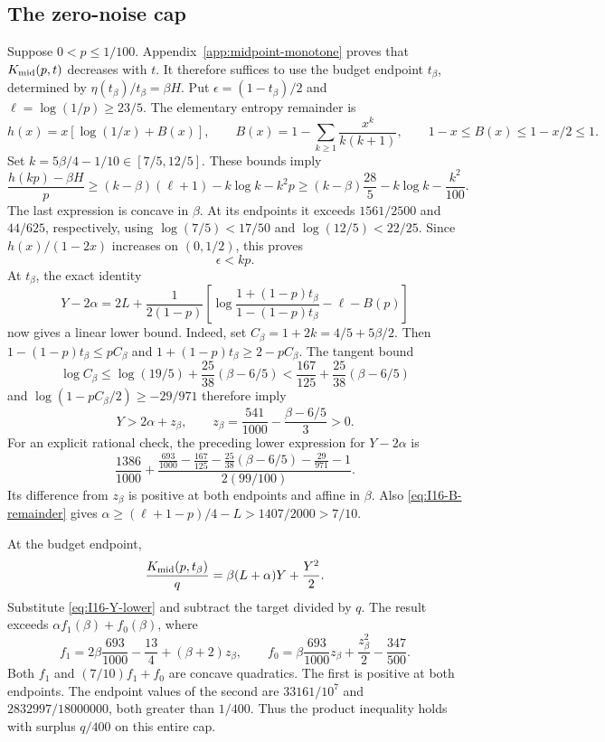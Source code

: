 \documentclass[11pt]{article}
\theoremstyle{remark}\newtheorem{remark}[theorem]{Remark}
\numberwithin{equation}{section}
\begin{document}
\subsection{The zero-noise cap}
Suppose $0<p\le1/100$. Appendix~\ref{app:midpoint-monotone} proves that
$K_{\rm mid}(p,t)$ decreases with $t$. It therefore suffices to use the budget
endpoint $t_\beta$, determined by $\eta(t_\beta)/t_\beta=\beta H$.
Put $\epsilon=(1-t_\beta)/2$ and $\ell=\log(1/p)\ge23/5$.
The elementary entropy remainder is
\begin{equation}\label{eq:I16-B-remainder}
 h(x)=x[\log(1/x)+B(x)],\qquad
 B(x)=1-\sum_{k\ge1}\frac{x^k}{k(k+1)},\qquad
 1-x\le B(x)\le1-x/2\le1.
\end{equation}
Set $k=5\beta/4-1/10\in[7/5,12/5]$. These bounds imply
\[
 \frac{h(kp)-\beta H}{p}
 \ge(k-\beta)(\ell+1)-k\log k-k^2p
 \ge(k-\beta)\frac{28}{5}-k\log k-\frac{k^2}{100}.
\]
The last expression is concave in $\beta$. At its endpoints it exceeds
$1561/2500$ and $44/625$, respectively, using
$\log(7/5)<17/50$ and $\log(12/5)<22/25$.
Since $h(x)/(1-2x)$ increases on $(0,1/2)$, this proves
\begin{equation}\label{eq:I16-epsilon}
 \epsilon<kp.
\end{equation}
At $t_\beta$, the exact identity
\[
 Y-2\alpha=2L+\frac{1}{2(1-p)}
 \left[\log\frac{1+(1-p)t_\beta}{1-(1-p)t_\beta}-\ell-B(p)\right]
\]
now gives a linear lower bound. Indeed, set $C_\beta=1+2k=4/5+5\beta/2$.
Then $1-(1-p)t_\beta\le pC_\beta$ and
$1+(1-p)t_\beta\ge2-pC_\beta$. The tangent bound
\[
 \log C_\beta\le\log(19/5)+\frac{25}{38}(\beta-6/5)
 <\frac{167}{125}+\frac{25}{38}(\beta-6/5)
\]
and $\log(1-pC_\beta/2)\ge-29/971$ therefore imply
\begin{equation}\label{eq:I16-Y-lower}
 Y>2\alpha+z_\beta,\qquad
 z_\beta=\frac{541}{1000}-\frac{\beta-6/5}{3}>0.
\end{equation}
For an explicit rational check, the preceding lower expression for $Y-2\alpha$ is
\[
 \frac{1386}{1000}+
 \frac{\frac{693}{1000}-\frac{167}{125}
       -\frac{25}{38}(\beta-6/5)-\frac{29}{971}-1}{2(99/100)}.
\]
Its difference from $z_\beta$ is positive at both endpoints and affine in $\beta$.
Also \eqref{eq:I16-B-remainder} gives
$\alpha\ge(\ell+1-p)/4-L>1407/2000>7/10$.

At the budget endpoint,
\[
 \frac{K_{\rm mid}(p,t_\beta)}q
 =\beta(L+\alpha)Y+\frac{Y^2}{2}.
\]
Substitute \eqref{eq:I16-Y-lower} and subtract the target divided by $q$.
The result exceeds $\alpha f_1(\beta)+f_0(\beta)$, where
\[
 f_1=2\beta\frac{693}{1000}-\frac{13}{4}+(\beta+2)z_\beta,
 \qquad
 f_0=\beta\frac{693}{1000}z_\beta+\frac{z_\beta^2}{2}-\frac{347}{500}.
\]
Both $f_1$ and $(7/10)f_1+f_0$ are concave quadratics. The first is positive
at both endpoints. The endpoint values of the second are
$33161/10^7$ and $2832997/18000000$, both greater than $1/400$.
Thus the product inequality holds with surplus $q/400$ on this entire cap.
\end{document}
